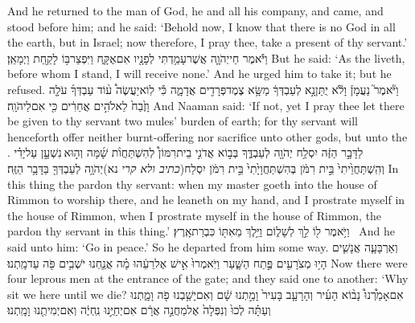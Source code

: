 {And he returned to the man of God, he and all his company, and came, and stood before him; and he said: ‘Behold now, I know that there is no God in all the earth, but in Israel; now therefore, I pray thee, take a present of thy servant.’}
{וַיֹּ֕אמֶר חַי\maqqaf יְהֹוָ֛ה אֲשֶׁר\maqqaf עָמַ֥דְתִּי לְפָנָ֖יו אִם\maqqaf אֶקָּ֑ח וַיִּפְצַר\maqqaf בּ֥וֹ לָקַ֖חַת וַיְמָאֵֽן׃}
{But he said: ‘As the \lord\space liveth, before whom I stand, I will receive none.’ And he urged him to take it; but he refused.}
{וַיֹּ֘אמֶר֮ נַעֲמָן֒ וָלֹ֕א יֻתַּן\maqqaf נָ֣א לְעַבְדְּךָ֔ מַשָּׂ֥א צֶמֶד\maqqaf פְּרָדִ֖ים אֲדָמָ֑ה כִּ֡י לֽוֹא\maqqaf יַעֲשֶׂה֩ ע֨וֹד עַבְדְּךָ֜ עֹלָ֤ה וָזֶ֙בַח֙ לֵאלֹהִ֣ים אֲחֵרִ֔ים כִּ֖י אִם\maqqaf לַיהֹוָֽה׃}
{And Naaman said: ‘If not, yet I pray thee let there be given to thy servant two mules’ burden of earth; for thy servant will henceforth offer neither burnt-offering nor sacrifice unto other gods, but unto the \lord.}
{לַדָּבָ֣ר הַזֶּ֔ה יִסְלַ֥ח יְהֹוָ֖ה לְעַבְדֶּ֑ךָ בְּב֣וֹא אֲדֹנִ֣י בֵית\maqqaf רִמּוֹן֩ לְהִשְׁתַּחֲוֺ֨ת שָׁ֜מָּה וְה֣וּא \legarmeh  נִשְׁעָ֣ן עַל\maqqaf יָדִ֗י וְהִֽשְׁתַּחֲוֵ֙יתִי֙ בֵּ֣ית רִמֹּ֔ן בְּהִשְׁתַּחֲוָיָ֙תִי֙ בֵּ֣ית רִמֹּ֔ן יִסְלַח\maqqaf (\textit{כתיב ולא קרי} נא)\maqqaf יְהֹוָ֥ה לְעַבְדְּךָ֖ בַּדָּבָ֥ר הַזֶּֽה׃}
{In this thing the \lord\space pardon thy servant: when my master goeth into the house of Rimmon to worship there, and he leaneth on my hand, and I prostrate myself in the house of Rimmon, when I prostrate myself in the house of Rimmon, the \lord\space pardon thy servant in this thing.’}
{וַיֹּ֥אמֶר ל֖וֹ לֵ֣ךְ לְשָׁל֑וֹם וַיֵּ֥לֶךְ מֵאִתּ֖וֹ כִּבְרַת\maqqaf אָֽרֶץ׃ \setuma }
{And he said unto him: ‘Go in peace.’ So he departed from him some way.}
\newperek
{}
\label{haft_28}
\setcounter{chap}{7}
\setcounter{verse}{3}
{וְאַרְבָּעָ֧ה אֲנָשִׁ֛ים הָי֥וּ מְצֹרָעִ֖ים פֶּ֣תַח הַשָּׁ֑עַר וַיֹּֽאמְרוּ֙ אִ֣ישׁ אֶל\maqqaf רֵעֵ֔הוּ מָ֗ה אֲנַ֛חְנוּ יֹשְׁבִ֥ים פֹּ֖ה עַד\maqqaf מָֽתְנוּ׃}
{Now there were four leprous men at the entrance of the gate; and they said one to another: ‘Why sit we here until we die?}
{אִם\maqqaf אָמַ֩רְנוּ֩ נָב֨וֹא הָעִ֜יר וְהָרָעָ֤ב בָּעִיר֙ וָמַ֣תְנוּ שָׁ֔ם וְאִם\maqqaf יָשַׁ֥בְנוּ פֹ֖ה וָמָ֑תְנוּ וְעַתָּ֗ה לְכוּ֙ וְנִפְּלָה֙ אֶל\maqqaf מַחֲנֵ֣ה אֲרָ֔ם אִם\maqqaf יְחַיֻּ֣נוּ נִֽחְיֶ֔ה וְאִם\maqqaf יְמִיתֻ֖נוּ וָמָֽתְנוּ׃}
